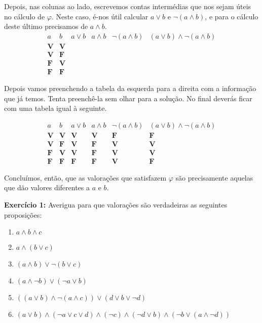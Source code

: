 \documentclass{article}
\theoremstyle{definition}
\theoremstyle{remark}
\newcommand{\V}{\mathbf{V}}
\newcommand{\F}{\mathbf{F}}
\begin{document}
	Depois, nas colunas ao lado, escrevemos contas intermédias que nos sejam úteis no cálculo de $\varphi$. Neste caso, é-nos útil calcular $a \lor b$ e $\neg (a \land b)$, e para o cálculo deste último precisamos de $a \land b$.
	\[
	\begin{array}{c|c|c|c|c|c}
	a & b & a \lor b & a \land b & \neg (a \land b) & (a \lor b) \land \neg (a \land b)\\
	\hline
	\V & \V &&&\\
	\V & \F &&&\\
	\F & \V &&&\\
	\F & \F &&&
	\end{array}
	\]
	
	Depois vamos preenchendo a tabela da esquerda para a direita com a informação que já temos. Tenta preenchê-la sem olhar para a solução. No final deverás ficar com uma tabela igual à seguinte.
	
	\[
	\begin{array}{c|c|c|c|c|c}
	a & b & a \lor b & a \land b & \neg (a \land b) & (a \lor b) \land \neg (a \land b)\\
	\hline
	\V & \V &\V&\V&\F&\F\\
	\V & \F &\V&\F&\V&\V\\
	\F & \V &\V&\F&\V&\V\\
	\F & \F &\F&\F&\V&\F
	\end{array}
	\]
	
	Concluímos, então, que as valorações que satisfazem $\varphi$ são precisamente aquelas que dão valores diferentes a $a$ e $b$.
	
	\medskip
	
	\textbf{Exercício 1:} Averigua para que valorações são verdadeiras as seguintes proposições:
	
	\begin{enumerate}
	\item $a \land b \land c$
	
	\item $a \land (b \lor c)$
	
	\item $(a \land b) \lor \neg (b \lor c)$
	
	\item $(a \land \neg b) \lor (\neg a \lor b)$
	
	\item $((a \lor b) \land \neg (a \land c)) \lor (d \lor b \lor \neg d)$
	
	\item $(a \lor b) \land (\neg a \lor c \lor d) \land (\neg c) \land (\neg d \lor b) \land (\neg b \lor (a \land \neg d))$
	\end{enumerate}
	
\end{document}
